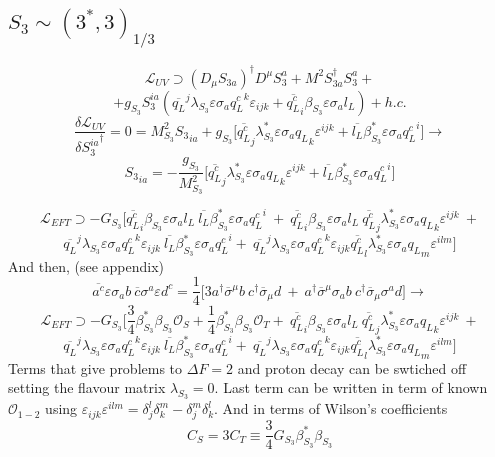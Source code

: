 \documentclass{article}
\begin{document}
\subsection{$S_3 \sim (3^*, 3)_{1/3}$}
\[
\mathcal{L}_{UV} \supset (D_\mu S_{3a})^\dagger D^\mu S_3^a + M^2 S_{3a}^\dagger S_3^a +
\]
\[
+g_{S_3} S_3^{ia}(\overline{q_L}^j \lambda_{S_3} \varepsilon \sigma_a {q^c_L}^k \varepsilon_{ijk} + \overline{q_L^c}_i \beta_{S_3} \varepsilon \sigma_a l_L) +h.c.
\]
\[
\frac{\delta \mathcal{L}_{UV}}{\delta {S_{3}^{ia}}^\dagger} =0 = M^2_{S_3} {S_3}_{ia} + g_{S_3} \big[ \overline{q_L^c}_j \lambda^*_{S_3} \varepsilon \sigma_a {q_L}_k \varepsilon^{ijk} + \overline{l_L} \beta_{S_3}^* \varepsilon \sigma_a {q^c_L}^i \big] \rightarrow
\]
\[
{S_3}_{ia} = -\frac{g_{S_3}}{M^2_{S_3}} \big[ \overline{q_L^c}_j \lambda^*_{S_3} \varepsilon \sigma_a {q_L}_k \varepsilon^{ijk} + \overline{l_L} \beta_{S_3}^* \varepsilon \sigma_a {q^c_L}^i \big] 
\]

\[
\mathcal{L}_{EFT} \supset -G_{S_3} \big[ \overline{q_L^c}_i \beta_{S_3} \varepsilon \sigma_a l_L \ \overline{l_L} \beta_{S_3}^* \varepsilon \sigma_a {q^c_L}^i \ + \ \overline{q_L^c}_i \beta_{S_3} \varepsilon \sigma_a l_L \ \overline{q_L^c}_j \lambda^*_{S_3} \varepsilon \sigma_a {q_L}_k \varepsilon^{ijk} \ +
\]
\[  \overline{q_L}^j \lambda_{S_3} \varepsilon \sigma_a {q^c_L}^k \varepsilon_{ijk} \ \overline{l_L} \beta_{S_3}^* \varepsilon \sigma_a {q^c_L}^i + \ \overline{q_L}^j \lambda_{S_3} \varepsilon \sigma_a {q^c_L}^k \varepsilon_{ijk} \overline{q_L^c}_l \lambda^*_{S_3} \varepsilon \sigma_a {q_L}_m \varepsilon^{ilm} \big] 
\]
And then, (see appendix)
\[
\overline{a^c} \varepsilon \sigma_a b \  \overline{c} \sigma^a \varepsilon  d^c= \frac{1}{4}\big[3 a^\dagger \overline{\sigma}^ \mu b \ c^\dagger \overline{\sigma}_\mu d \ + \ a^\dagger \overline{\sigma}^\mu  \sigma_a b \ c^\dagger \overline{\sigma}_\mu  \sigma^a d \big] \rightarrow
\]
\[
\mathcal{L}_{EFT} \supset -G_{S_3} \big[ \frac{3}{4} \beta_{S_3}^* \beta_{S_3} \mathcal{O}_S + \frac{1}{4}\beta_{S_3}^* \beta_{S_3} \mathcal{O}_T + \ \overline{q_L^c}_i \beta_{S_3} \varepsilon \sigma_a l_L \ \overline{q_L^c}_j \lambda^*_{S_3} \varepsilon \sigma_a {q_L}_k \varepsilon^{ijk} \ +
\]
\[  \overline{q_L}^j \lambda_{S_3} \varepsilon \sigma_a {q^c_L}^k \varepsilon_{ijk} \ \overline{l_L} \beta_{S_3}^* \varepsilon \sigma_a {q^c_L}^i + \ \overline{q_L}^j \lambda_{S_3} \varepsilon \sigma_a {q^c_L}^k \varepsilon_{ijk} \overline{q_L^c}_l \lambda^*_{S_3} \varepsilon \sigma_a {q_L}_m \varepsilon^{ilm} \big] 
\]
Terms that give problems to $\Delta F=2$ and proton decay can be swtiched off setting the flavour matrix $\lambda_{S_3}=0$. Last term can be written in term of known $\mathcal{O}_{1-2}$ using $\varepsilon_{ijk} \varepsilon^{ilm} = \delta_j^l \delta_k^m -\delta_j^m \delta_k^l $.
And in terms of Wilson's coefficients
\[
C_S = 3 C_T \equiv \frac{3}{4} G_{S_3} \beta_{S_3}^* \beta_{S_3}
\]
\end{document}
